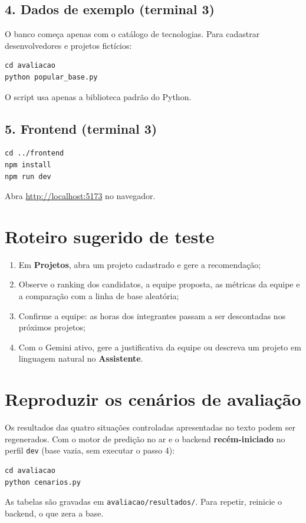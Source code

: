 \documentclass[12pt,a4paper]{article}
\begin{document}
\subsection*{4. Dados de exemplo (terminal 3)}
O banco começa apenas com o catálogo de tecnologias. Para cadastrar desenvolvedores e projetos fictícios:
\begin{lstlisting}
cd avaliacao
python popular_base.py
\end{lstlisting}
O script usa apenas a biblioteca padrão do Python.

\subsection*{5. Frontend (terminal 3)}
\begin{lstlisting}
cd ../frontend
npm install
npm run dev
\end{lstlisting}
Abra \url{http://localhost:5173} no navegador.

\section{Roteiro sugerido de teste}

\begin{enumerate}[noitemsep]
  \item Em \textbf{Projetos}, abra um projeto cadastrado e gere a recomendação;
  \item Observe o ranking dos candidatos, a equipe proposta, as métricas da equipe e a comparação com a linha de base aleatória;
  \item Confirme a equipe: as horas dos integrantes passam a ser descontadas nos próximos projetos;
  \item Com o Gemini ativo, gere a justificativa da equipe ou descreva um projeto em linguagem natural no \textbf{Assistente}.
\end{enumerate}

\section{Reproduzir os cenários de avaliação}

Os resultados das quatro situações controladas apresentadas no texto podem ser regenerados. Com o motor de predição no ar e o backend \textbf{recém-iniciado} no perfil \texttt{dev} (base vazia, sem executar o passo 4):
\begin{lstlisting}
cd avaliacao
python cenarios.py
\end{lstlisting}
As tabelas são gravadas em \texttt{avaliacao/resultados/}. Para repetir, reinicie o backend, o que zera a base.
\end{document}
